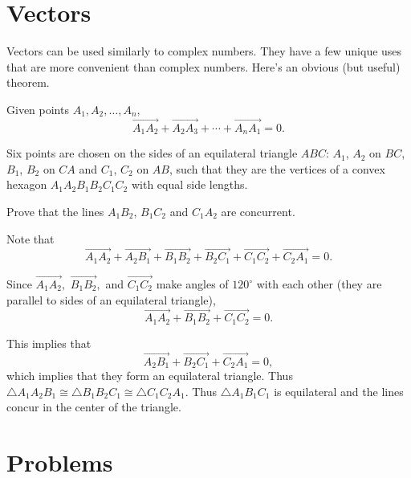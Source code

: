 \documentclass[mast]{lucky}
\begin{document}
\section{Vectors}
Vectors can be used similarly to complex numbers. They have a few unique uses that are more convenient than complex numbers. Here's an obvious (but useful) theorem.

\begin{theo}[Polygon]
Given points $A_1,A_2,\ldots,A_n,$
\[\overrightarrow{A_1A_2}+\overrightarrow{A_2A_3}+\cdots+\overrightarrow{A_nA_1}=0.\]
\end{theo}

\begin{exam}[IMO 2005/1]
Six points are chosen on the sides of an equilateral triangle $ABC$: $A_1$, $A_2$ on $BC$, $B_1$, $B_2$ on $CA$ and $C_1$, $C_2$ on $AB$, such that they are the vertices of a convex hexagon $A_1A_2B_1B_2C_1C_2$ with equal side lengths.

Prove that the lines $A_1B_2$, $B_1C_2$ and $C_1A_2$ are concurrent.
\end{exam}

\begin{sol}
Note that $$\overrightarrow{A_1A_2}+\overrightarrow{A_2B_1}+\overrightarrow{B_1B_2}+\overrightarrow{B_2C_1}+\overrightarrow{C_1C_2}+\overrightarrow{C_2A_1}=0.$$

Since $\overrightarrow{A_1A_2},$ $\overrightarrow{B_1B_2},$ and $\overrightarrow{C_1C_2}$ make angles of $120^{\circ}$ with each other (they are parallel to sides of an equilateral triangle), $$\overrightarrow{A_1A_2}+\overrightarrow{B_1B_2}+\overrightarrow{C_1C_2}=0.$$

This implies that $$\overrightarrow{A_2B_1}+\overrightarrow{B_2C_1}+\overrightarrow{C_2A_1}=0,$$ which implies that they form an equilateral triangle. Thus $\triangle A_1A_2B_1 \cong \triangle B_1B_2C_1 \cong \triangle C_1C_2A_1.$ Thus $\triangle A_1B_1C_1$ is equilateral and the lines concur in the center of the triangle.
\end{sol}

\pagebreak

\section{Problems}


\end{document}
